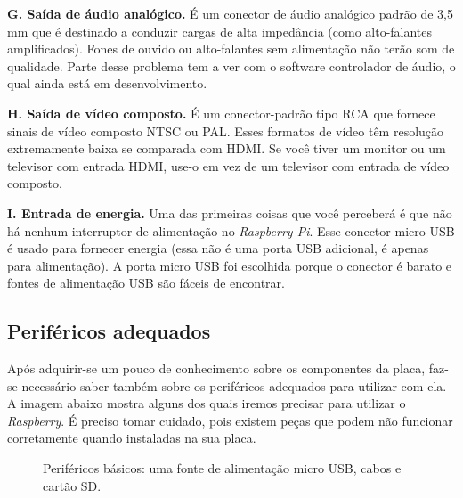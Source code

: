 \textbf{G. Saída de áudio analógico.} É um conector de áudio analógico padrão de 3,5 mm que é destinado a conduzir cargas de alta impedância (como alto-falantes amplificados). Fones de ouvido ou alto-falantes sem alimentação não terão som de qualidade. Parte desse problema tem a ver com o software controlador de áudio, o qual ainda está em desenvolvimento.

\textbf{H. Saída de vídeo composto.} É um conector-padrão tipo RCA que fornece sinais de vídeo composto NTSC ou PAL. Esses formatos de vídeo têm resolução extremamente baixa se comparada com HDMI. Se você tiver um monitor ou um televisor com entrada HDMI, use-o em vez de um televisor com entrada de vídeo composto.

\textbf{I. Entrada de energia.} Uma das primeiras coisas que você perceberá é que não há nenhum interruptor de alimentação no \textit{Raspberry Pi}. Esse conector micro USB é usado para fornecer energia (essa não é uma porta USB adicional, é apenas para alimentação). A porta micro USB foi escolhida porque o conector é barato e fontes de alimentação USB são fáceis de encontrar.

\newpage

\subsection{Periféricos adequados}

Após adquirir-se um pouco de conhecimento sobre os componentes da placa, faz-se necessário saber também sobre os periféricos adequados para utilizar com ela. A imagem abaixo mostra alguns dos quais iremos precisar para utilizar o \textit{Raspberry}. É preciso tomar cuidado, pois existem peças que podem não funcionar corretamente quando instaladas na sua placa.

\begin{figure}[ht]
    \centering
    \caption{Periféricos básicos: uma fonte de alimentação micro USB, cabos e cartão SD.}
\end{figure}

